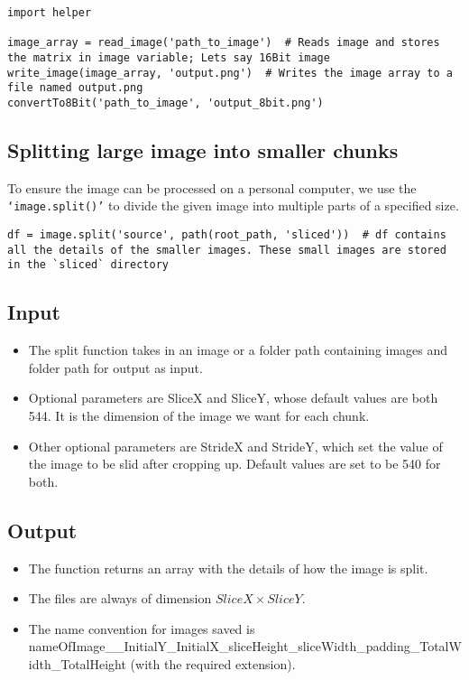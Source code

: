 \begin{verbatim}
import helper

image_array = read_image('path_to_image')  # Reads image and stores the matrix in image variable; Lets say 16Bit image
write_image(image_array, 'output.png')  # Writes the image array to a file named output.png
convertTo8Bit('path_to_image', 'output_8bit.png')
\end{verbatim}


\subsection{Splitting large image into smaller chunks}
To ensure the image can be processed on a personal computer, we use the \texttt{`image.split()'} to divide the given image into multiple parts of a specified size.

\begin{verbatim}
df = image.split('source', path(root_path, 'sliced'))  # df contains all the details of the smaller images. These small images are stored in the `sliced` directory
\end{verbatim}

\subsection*{Input}
\begin{itemize}
  \setlength\itemsep{1mm}
  \item The split function takes in an image or a folder path containing images and folder path for output as input.
  \item Optional parameters are SliceX and SliceY, whose default values are both 544. It is the dimension of the image we want for each chunk.
  \item Other optional parameters are StrideX and StrideY, which set the value of the image to be slid after cropping up. Default values are set to be 540 for both.
\end{itemize}

\subsection*{Output}
\begin{itemize}
  \setlength\itemsep{1mm}
  \item The function returns an array with the details of how the image is split.
  \item The files are always of dimension $SliceX\times SliceY$.
  \item The name convention for images saved is \newline
    nameOfImage\_\_InitialY\_InitialX\_sliceHeight\_sliceWidth\_padding\_TotalWidth\_TotalHeight \newline
    (with the required extension).
\end{itemize}



